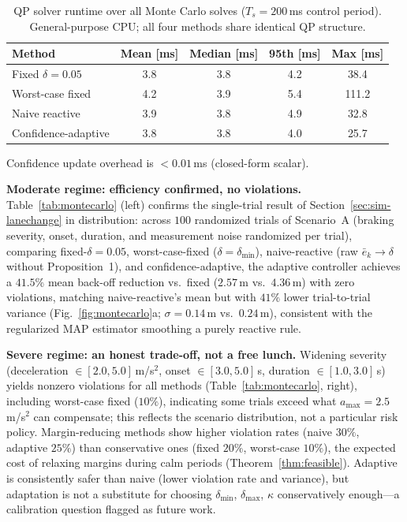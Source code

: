 \begin{table}[t]
\centering
\caption{QP solver runtime over all Monte Carlo solves ($T_s=200$\,ms control period). General-purpose CPU; all four methods share identical QP structure.}
\label{tab:runtime}
\small
\begin{tabular}{lcccc}
\toprule
Method & Mean [ms] & Median [ms] & 95th [ms] & Max [ms] \\
\midrule
Fixed $\delta=0.05$  & 3.8 & 3.8 & 4.2  & 38.4  \\
Worst-case fixed     & 4.2 & 3.9 & 5.4  & 111.2 \\
Naive reactive       & 3.9 & 3.8 & 4.9  & 32.8  \\
Confidence-adaptive  & 3.8 & 3.8 & 4.0  & 25.7  \\
\bottomrule
\end{tabular}
\vspace{2pt}
\footnotesize Confidence update overhead is $<0.01$\,ms (closed-form scalar).
\end{table}

\textbf{Moderate regime: efficiency confirmed, no violations.}
Table~\ref{tab:montecarlo} (left) confirms the single-trial result of
Section~\ref{sec:sim-lanechange} in distribution: across $100$ randomized
trials of Scenario~A (braking severity, onset, duration, and measurement noise
randomized per trial), comparing fixed-$\delta=0.05$, worst-case-fixed
($\delta=\delta_{\min}$), naive-reactive (raw $\bar e_k\!\to\!\delta$ without
Proposition~1), and confidence-adaptive, the adaptive controller achieves a
$41.5\%$ mean back-off reduction vs.\ fixed ($2.57$\,m vs.\ $4.36$\,m) with
zero violations, matching naive-reactive's mean but with $41\%$ lower
trial-to-trial variance (Fig.~\ref{fig:montecarlo}a; $\sigma=0.14$\,m vs.\
$0.24$\,m), consistent with the regularized MAP estimator smoothing a purely
reactive rule.

\textbf{Severe regime: an honest trade-off, not a free lunch.}
Widening severity (deceleration $\in[2.0,5.0]$\,m/s$^2$, onset
$\in[3.0,5.0]$\,s, duration $\in[1.0,3.0]$\,s) yields nonzero violations
for all methods (Table~\ref{tab:montecarlo}, right), including worst-case
fixed ($10\%$), indicating some trials exceed what $a_{\max}=2.5$\,m/s$^2$
can compensate; this reflects the scenario distribution, not a particular
risk policy. Margin-reducing methods show higher violation rates (naive
$30\%$, adaptive $25\%$) than conservative ones (fixed $20\%$, worst-case
$10\%$), the expected cost of relaxing margins during calm periods
(Theorem~\ref{thm:feasible}). Adaptive is consistently safer than naive
(lower violation rate and variance), but adaptation is not a substitute for
choosing $\delta_{\min}$, $\delta_{\max}$, $\kappa$ conservatively enough---a
calibration question flagged as future work.

